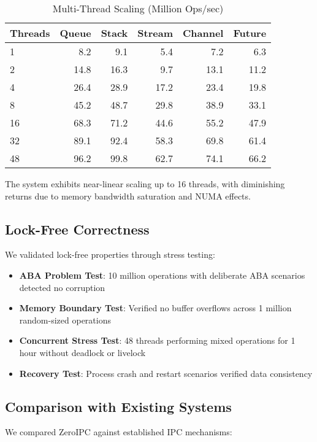 \documentclass[10pt,conference]{IEEEtran}
\begin{document}
\begin{table}[h]
\centering
\caption{Multi-Thread Scaling (Million Ops/sec)}
\label{tab:scaling}
\begin{tabular}{lrrrrr}
\toprule
Threads & Queue & Stack & Stream & Channel & Future \\
\midrule
1 & 8.2 & 9.1 & 5.4 & 7.2 & 6.3 \\
2 & 14.8 & 16.3 & 9.7 & 13.1 & 11.2 \\
4 & 26.4 & 28.9 & 17.2 & 23.4 & 19.8 \\
8 & 45.2 & 48.7 & 29.8 & 38.9 & 33.1 \\
16 & 68.3 & 71.2 & 44.6 & 55.2 & 47.9 \\
32 & 89.1 & 92.4 & 58.3 & 69.8 & 61.4 \\
48 & 96.2 & 99.8 & 62.7 & 74.1 & 66.2 \\
\bottomrule
\end{tabular}
\end{table}

The system exhibits near-linear scaling up to 16 threads, with diminishing returns due to memory bandwidth saturation and NUMA effects.

\subsection{Lock-Free Correctness}

We validated lock-free properties through stress testing:

\begin{itemize}
\item \textbf{ABA Problem Test}: 10 million operations with deliberate ABA scenarios detected no corruption
\item \textbf{Memory Boundary Test}: Verified no buffer overflows across 1 million random-sized operations
\item \textbf{Concurrent Stress Test}: 48 threads performing mixed operations for 1 hour without deadlock or livelock
\item \textbf{Recovery Test}: Process crash and restart scenarios verified data consistency
\end{itemize}

\subsection{Comparison with Existing Systems}

We compared ZeroIPC against established IPC mechanisms:
\end{document}
